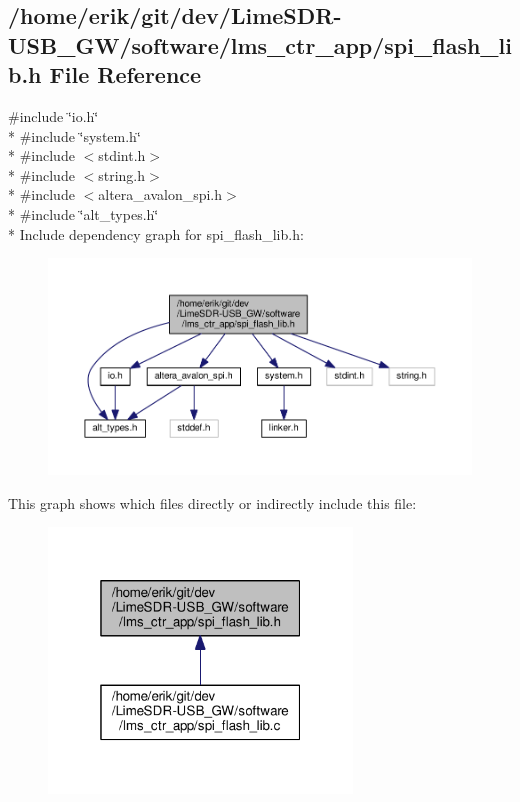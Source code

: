 \subsection{/home/erik/git/dev/\+Lime\+S\+D\+R-\/\+U\+S\+B\+\_\+\+G\+W/software/lms\+\_\+ctr\+\_\+app/spi\+\_\+flash\+\_\+lib.h File Reference}
\label{spi__flash__lib_8h}
{\ttfamily \#include \char`\"{}io.\+h\char`\"{}}\\*
{\ttfamily \#include \char`\"{}system.\+h\char`\"{}}\\*
{\ttfamily \#include $<$stdint.\+h$>$}\\*
{\ttfamily \#include $<$string.\+h$>$}\\*
{\ttfamily \#include $<$altera\+\_\+avalon\+\_\+spi.\+h$>$}\\*
{\ttfamily \#include \char`\"{}alt\+\_\+types.\+h\char`\"{}}\\*
Include dependency graph for spi\+\_\+flash\+\_\+lib.\+h\+:
\nopagebreak
\begin{figure}[H]
\begin{center}
\leavevmode
\includegraphics[width=350pt]{d1/d09/spi__flash__lib_8h__incl}
\end{center}
\end{figure}
This graph shows which files directly or indirectly include this file\+:
\nopagebreak
\begin{figure}[H]
\begin{center}
\leavevmode
\includegraphics[width=229pt]{d2/d50/spi__flash__lib_8h__dep__incl}
\end{center}
\end{figure}
